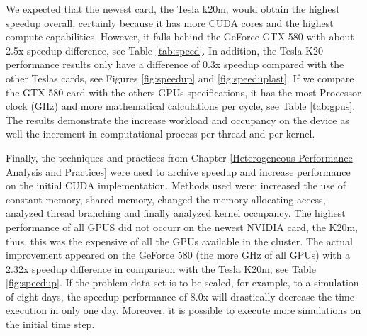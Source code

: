 We expected that the newest card, the Tesla k20m, would obtain the highest speedup overall, certainly because it has more CUDA cores and the highest compute capabilities. However, it falls behind the GeForce GTX 580 with about 2.5x speedup difference, see Table \ref{tab:speed}. In addition, the Tesla K20 performance results only have a difference of 0.3x speedup compared with the other Teslas cards, see Figures \ref{fig:speedup} and \ref{fig:speeduplast}. If we compare the GTX 580 card with the others GPUs specifications, it has the most Processor clock (GHz) and more mathematical calculations per cycle, see Table \ref{tab:gpus}. The results demonstrate the increase workload and occupancy on the device as well the increment in computational process per thread and per kernel.


  \vspace{4.0em}

Finally, the techniques and practices from Chapter \ref{Heterogeneous Performance Analysis and Practices} were used to archive speedup and increase performance on the initial CUDA implementation. Methods used were: increased the use of constant memory, shared memory, changed the memory allocating access, analyzed thread branching and finally analyzed kernel occupancy. The highest performance of all GPUS did not occurr on the newest NVIDIA card, the K20m, thus, this was the expensive of all the GPUs available in the cluster. The actual improvement appeared on the GeForce 580 (the more GHz of all GPUs) with a 2.32x speedup difference in comparison with the Tesla K20m, see Table \ref{fig:speedup}. If the problem data set is to be scaled, for example, to a simulation of eight days, the speedup performance of 8.0x will drastically decrease the time execution in only one day. Moreover, it is possible to execute more simulations on the initial time step.
  
